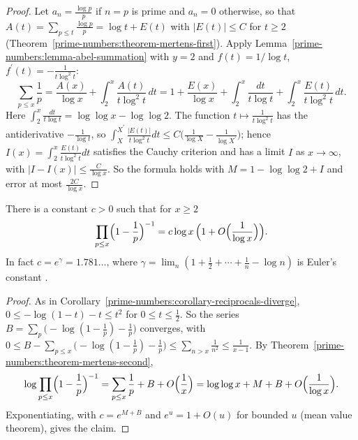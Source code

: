 \begin{proof}
Let $a_n = \frac{\log p}{p}$ if $n = p$ is prime and $a_n = 0$ otherwise, so that $A(t) = \sum_{p \leq t}\frac{\log p}{p} = \log t + E(t)$ with $|E(t)| \leq C$ for $t \geq 2$
(Theorem~\ref{prime-numbers:theorem-mertens-first}). Apply Lemma~\ref{prime-numbers:lemma-abel-summation} with $y = 2$ and $f(t) = 1/\log t$, $f^{\prime}(t) = -\frac{1}{t\log^2t}$:
\[
\sum_{p \leq x}\frac1p = \frac{A(x)}{\log x} + \int_2^x\frac{A(t)}{t\log^2t}\,dt = 1 + \frac{E(x)}{\log x} + \int_2^x\frac{dt}{t\log t} + \int_2^x\frac{E(t)}{t\log^2t}\,dt.
\]
Here $\int_2^x\frac{dt}{t\log t} = \log\log x - \log\log 2$. The function $t \mapsto \frac{1}{t\log^2t}$ has the antiderivative $-\frac{1}{\log t}$, so $\int_X^{X^{\prime}}\frac{|E(t)|}{t\log^2t}dt \leq
C\bigl(\frac{1}{\log X} - \frac{1}{\log X^{\prime}}\bigr)$; hence $I(x) = \int_2^x\frac{E(t)}{t\log^2t}dt$ satisfies the Cauchy criterion and has a limit $I$ as $x \to \infty$, with
$|I - I(x)| \leq \frac{C}{\log x}$. So the formula holds with $M = 1 - \log\log 2 + I$ and error at most $\frac{2C}{\log x}$.
\end{proof}

\begin{theorem}\label{prime-numbers:theorem-mertens-third}
There is a constant $c > 0$ such that for $x \geq 2$
\[
\prod_{p \leq x}\Bigl(1 - \frac1p\Bigr)^{-1} = c\log x\,\Bigl(1 + O\Bigl(\frac{1}{\log x}\Bigr)\Bigr).
\]
In fact $c = e^\gamma = 1.781\ldots$, where $\gamma = \lim_n(1 + \frac12 + \cdots + \frac1n - \log n)$ is Euler's constant \cite{hardy-wright}.
\end{theorem}

\begin{proof}
As in Corollary~\ref{prime-numbers:corollary-reciprocals-diverge}, $0 \leq -\log(1 - t) - t \leq t^2$ for $0 \leq t \leq \frac12$. So the series $B = \sum_p\bigl(-\log(1 - \frac1p) - \frac1p\bigr)$ converges,
with $0 \leq B - \sum_{p \leq x}\bigl(-\log(1 - \frac1p) - \frac1p\bigr) \leq \sum_{n > x}\frac{1}{n^2} \leq \frac{1}{x - 1}$. By Theorem~\ref{prime-numbers:theorem-mertens-second},
\[
\log\prod_{p \leq x}\Bigl(1 - \frac1p\Bigr)^{-1} = \sum_{p \leq x}\frac1p + B + O\Bigl(\frac1x\Bigr) = \log\log x + M + B + O\Bigl(\frac{1}{\log x}\Bigr).
\]
Exponentiating, with $c = e^{M+B}$ and $e^u = 1 + O(u)$ for bounded $u$ (mean value theorem), gives the claim.
\end{proof}

